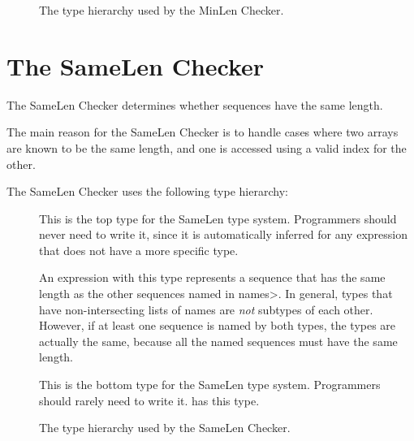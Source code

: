\begin{figure}
  \caption{The type hierarchy used by the MinLen Checker.}
  \label{fig-minlen-types}
\end{figure}

\section{The SameLen Checker\label{index-samelen}}

The SameLen Checker determines whether sequences have the same length.

The main reason for the SameLen Checker is to handle cases where two
arrays are known to be the same length, and one is accessed using a
valid index for the other.

The SameLen Checker uses the following type hierarchy:

\begin{description}
  \item[]
  This is the top type for the SameLen type system.
  Programmers should never need to write it, since it
  is automatically inferred for any expression that does
  not have a more specific type.
\item[]
  An expression with this type represents a sequence that has the
  same length as the other sequences named in \<names>. In general,
   types that have non-intersecting lists of names
  are \textit{not} subtypes of each other. However, if at least one
  sequence is named by both types, the types are actually the same,
  because all the named sequences must have the same length.
\item[]
  This is the bottom type for the SameLen type system.
  Programmers should rarely need to write it.
   has this type.
  \end{description}

\begin{figure}
  \caption{The type hierarchy used by the SameLen Checker.}
  \label{fig-samelen-types}
\end{figure}
